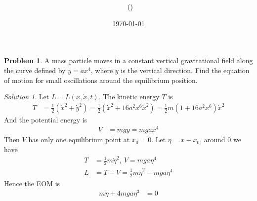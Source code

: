 \documentclass[twoside,11pt]{article}
\title{{\lms \Code \ \Ass}}
\author{\lms \name \ (\href{mailto:\mail}{\mail})}
\date{\sffamily \today}
\makeatletter
\newcommand{\lms}{\fontfamily{lmss}\selectfont} %
\theoremstyle{definition}
\newtheorem{problem}{\lms Problem}
\theoremstyle{remark}
\newtheorem*{solution}{Solution}
\renewcommand{\maketitle}{\bgroup\setlength{\parindent}{0pt}
\begin{flushleft}
  \textbf{\Large\@title}

  \@author
\end{flushleft}\egroup
}
\makeatother
\begin{document}
\maketitle
\thispagestyle{title}

\begin{problem}
A mass particle moves in a constant vertical gravitational field along the curve
defined by $y=ax^4$, where $y$ is the vertical direction.
Find the equation of motion for small oscillations around the equilibrium position.
\end{problem}
\begin{solution}
Let $L=L(x,\dot x, t)$.
The kinetic energy $T$ is
\begin{align*}
    T &= \frac{1}{2}(\dot x^2 + \dot y^2) = \frac{1}{2}(\dot x^2 + 16a^2x^6\dot x^2)
    = \frac{1}{2}m(1 + 16a^2x^6) \dot x^2
\end{align*}
And the potential energy is
\begin{align*}
    V &= mgy = mgax^4
\end{align*}
Then $V$ has only one equilibrium point at $x_0=0$.
Let $\eta = x-x_0$, around $0$ we have
\begin{align*}
    T &= \frac{1}{2}m \dot \eta^2, ~V= mga\eta^4\\
    L &= T - V = \frac{1}{2}m\dot\eta^2 - mga\eta^4
\end{align*}
Hence the EOM is 
\begin{align*}
    m\ddot \eta + 4mga \eta^3 &= 0
\end{align*}
\end{solution}
\end{document}
